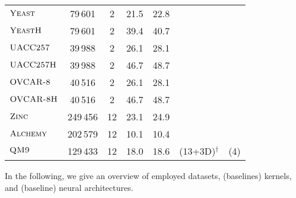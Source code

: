 \documentclass{article}
\theoremstyle{definition}
\newcommand{\cmark}{\ding{51}}\newcommand{\xmark}{\ding{55}}
\begin{document}
\begin{table}[h]
\begin{center}
{\begin{tabular}{@{}lcccccc@{}}
				$\textsc{Yeast}$       &   79\,601&	2&	21.5&	22.8                & \cmark  & \cmark           \\
				$\textsc{YeastH}$       &  79\,601&	2&	39.4&	40.7                  & \cmark  & \cmark           \\
				$\textsc{UACC257}$       &      39\,988&	2&	26.1&	28.1                      & \cmark  & \cmark           \\
				$\textsc{UACC257H}$       &  39\,988&	2&	46.7&	48.7      & \cmark  & \cmark           \\
				$\textsc{OVCAR-8}$       &      	40\,516&	2&	26.1&	28.1             & \cmark  & \cmark           \\
				$\textsc{OVCAR-8H}$       &        40\,516	&2&	46.7&	48.7              & \cmark  & \cmark           \\
				\midrule        
				$\textsc{Zinc}$       &  249\,456 &12	&23.1 &	24.9     & \cmark  & \cmark           \\
				$\textsc{Alchemy}$       & 202\,579 &12	& 10.1 &	10.4 	     & \cmark  & \cmark           \\
				$\textsc{QM9}$       &129\,433  &12	& 18.0 &	18.6     & \cmark (13+3D)$^\dagger$  & \cmark (4)          \\
				\bottomrule
		\end{tabular}}
		\label{ds}
	\end{center}
\end{table}

In the following, we give an overview of employed datasets, (baselines) kernels, and (baseline) neural architectures. 
\end{document}
